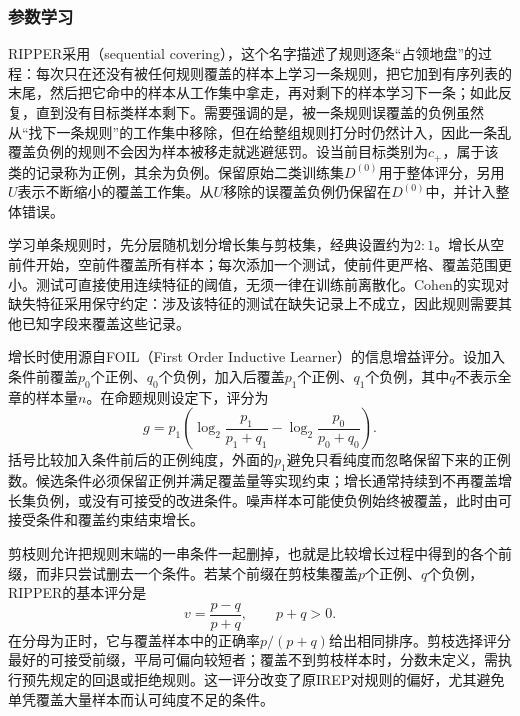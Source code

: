 \subsubsection{参数学习}
\label{sec:classification-ripper-learning}

RIPPER采用（sequential covering），这个名字描述了规则逐条“占领地盘”的过程：每次只在还没有被任何规则覆盖的样本上学习一条规则，把它加到有序列表的末尾，然后把它命中的样本从工作集中拿走，再对剩下的样本学习下一条；如此反复，直到没有目标类样本剩下。需要强调的是，被一条规则误覆盖的负例虽然从“找下一条规则”的工作集中移除，但在给整组规则打分时仍然计入，因此一条乱覆盖负例的规则不会因为样本被移走就逃避惩罚。设当前目标类别为$c_+$，属于该类的记录称为正例，其余为负例。保留原始二类训练集$D^{(0)}$用于整体评分，另用$U$表示不断缩小的覆盖工作集。从$U$移除的误覆盖负例仍保留在$D^{(0)}$中，并计入整体错误。

学习单条规则时，先分层随机划分增长集与剪枝集，经典设置约为$2:1$。增长从空前件开始，空前件覆盖所有样本；每次添加一个测试，使前件更严格、覆盖范围更小。测试可直接使用连续特征的阈值，无须一律在训练前离散化。Cohen的实现对缺失特征采用保守约定：涉及该特征的测试在缺失记录上不成立，因此规则需要其他已知字段来覆盖这些记录。

增长时使用源自FOIL（First Order Inductive Learner）的信息增益评分。设加入条件前覆盖$p_0$个正例、$q_0$个负例，加入后覆盖$p_1$个正例、$q_1$个负例，其中$q$不表示全章的样本量$n$。在命题规则设定下，评分为
\begin{equation}
  g=p_1\left(
  \log_2\frac{p_1}{p_1+q_1}
  -\log_2\frac{p_0}{p_0+q_0}
  \right).
  \label{eq:classification-foil-gain}
\end{equation}
括号比较加入条件前后的正例纯度，外面的$p_1$避免只看纯度而忽略保留下来的正例数。候选条件必须保留正例并满足覆盖量等实现约束；增长通常持续到不再覆盖增长集负例，或没有可接受的改进条件。噪声样本可能使负例始终被覆盖，此时由可接受条件和覆盖约束结束增长。

剪枝则允许把规则末端的一串条件一起删掉，也就是比较增长过程中得到的各个前缀，而非只尝试删去一个条件。若某个前缀在剪枝集覆盖$p$个正例、$q$个负例，RIPPER的基本评分是
\begin{equation}
  v=\frac{p-q}{p+q},\qquad p+q>0.
  \label{eq:classification-ripper-pruning}
\end{equation}
在分母为正时，它与覆盖样本中的正确率$p/(p+q)$给出相同排序。剪枝选择评分最好的可接受前缀，平局可偏向较短者；覆盖不到剪枝样本时，分数未定义，需执行预先规定的回退或拒绝规则。这一评分改变了原IREP对规则的偏好，尤其避免单凭覆盖大量样本而认可纯度不足的条件。

